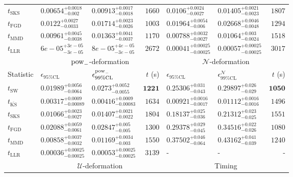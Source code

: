 \begin{tabular}{l|llr|llr}
	$t_{\mathrm{SKS}}$ & $0.00654_{-0.002}^{+0.0018}$ & $0.00913_{-0.0018}^{+0.0017}$ & $1660$ & $0.0106_{-0.0027}^{+0.0024}$ & $0.01405_{-0.0023}^{+0.0021}$ & $1807$ \\
	$t_{\mathrm{FGD}}$ & $0.0122_{-0.0033}^{+0.0027}$ & $0.01714_{-0.0026}^{+0.0023}$ & $1003$ & $0.01964_{-0.006}^{+0.0054}$ & $0.02668_{-0.0048}^{+0.0046}$ & $1294$ \\
	$t_{\mathrm{MMD}}$ & $0.00961_{-0.0038}^{+0.0045}$ & $0.01363_{-0.0037}^{+0.0041}$ & $1170$ & $0.00788_{-0.0027}^{+0.0032}$ & $0.01064_{-0.0024}^{+0.003}$ & $1518$ \\
	$t_{\mathrm{LLR}}$ & $6e-05_{-3e-05}^{+3e-05}$ & $8e-05_{-3e-05}^{+4e-05}$ & $2672$ & $0.00041_{-0.00025}^{+0.00025}$ & $0.00057_{-0.00025}^{+0.00025}$ & $3017$ \\
	\toprule
	\multicolumn{1}{c}{} & \multicolumn{3}{c}{$\rm{pow}_{-}$-deformation} & \multicolumn{3}{c}{$\mathcal{N}$-deformation} \\
	Statistic & $\epsilon_{95\%\mathrm{CL}}$ & $\epsilon^  {\rm{pow}_{-}}_{99\%\mathrm{CL}}$ & $t$ (s) & $\epsilon_{95\%\mathrm{CL}}$ & $\epsilon^    {\mathcal{N}}_{99\%\mathrm{CL}}$ & $t$ (s) \\
	\midrule
	$t_{\mathrm{SW}}$ & $0.01989_{-0.0064}^{+0.0056}$ & $0.0273_{-0.0055}^{+0.0052}$ & ${\mathbf{1221}}$ & $0.25306_{-0.043}^{+0.031}$ & $0.29897_{-0.029}^{+0.026}$ & ${\mathbf{1050}}$ \\
	$t_{\overline{\mathrm{KS}}}$ & ${\mathbf{0.00317_{-0.00089}^{+0.0009}}}$ & ${\mathbf{0.00416_{-0.00083}^{+0.0009}}}$ & $1634$ & ${\mathbf{0.00921_{-0.0017}^{+0.0016}}}$ & ${\mathbf{0.01112_{-0.0016}^{+0.0016}}}$ & $1496$ \\
	$t_{\mathrm{SKS}}$ & $0.01066_{-0.0027}^{+0.0023}$ & $0.01407_{-0.0022}^{+0.0021}$ & $1804$ & $0.18137_{-0.036}^{+0.025}$ & $0.21312_{-0.025}^{+0.023}$ & $1551$ \\
	$t_{\mathrm{FGD}}$ & $0.02088_{-0.0061}^{+0.0059}$ & $0.02847_{-0.005}^{+0.005}$ & $1300$ & $0.29378_{-0.045}^{+0.029}$ & $0.34516_{-0.026}^{+0.022}$ & $1080$ \\
	$t_{\mathrm{MMD}}$ & $0.00858_{-0.0032}^{+0.0037}$ & $0.01169_{-0.003}^{+0.0034}$ & $1550$ & $0.37502_{-0.064}^{+0.046}$ & $0.43162_{-0.039}^{+0.041}$ & $1240$ \\
	$t_{\mathrm{LLR}}$ & $0.00036_{-0.00025}^{+0.00025}$ & $0.00053_{-0.00025}^{+0.00025}$ & $3139$ & - & - & - \\
	\toprule
	\multicolumn{1}{c}{} & \multicolumn{3}{c}{$\mathcal{U}$-deformation} & \multicolumn{3}{c}{Timing} \\

\end{tabular}
